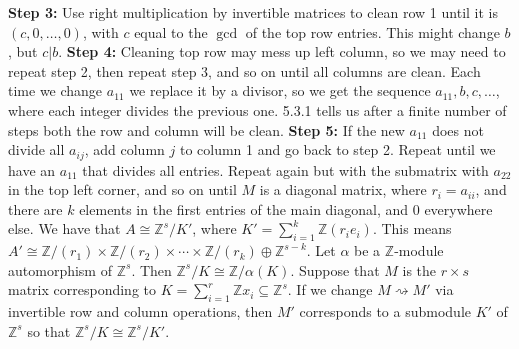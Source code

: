 \textbf{Step 3:} Use right multiplication by invertible matrices to clean row 1 until it is $(c, 0, \ldots, 0)$, with $c$ equal to the $\gcd$ of the top row entries. This might change $b$, but $c|b$.
\textbf{Step 4:} Cleaning top row may mess up left column, so we may need to repeat step 2, then repeat step 3, and so on until all columns are clean. Each time we change $a_11$ we replace it by a divisor, so we get the sequence $a_{11}, b, c, \ldots$, where each integer divides the previous one. 5.3.1 tells us after a finite number of steps both the row and column will be clean.
\textbf{Step 5:} If the new $a_{11}$ does not divide all $a_{ij}$, add column $j$ to column 1 and go back to step 2. Repeat until we have an $a_{11}$ that divides all entries. Repeat again but with the submatrix with $a_{22}$ in the top left corner, and so on until $M$ is a diagonal matrix, where $r_i = a_{ii}$, and there are $k$ elements in the first entries of the main diagonal, and 0 everywhere else. We have that $A \cong \mathbb{Z}^s/K'$, where $K' = \sum^k_{i=1} \mathbb{Z}(r_i e_i)$. This means $A' \cong \mathbb{Z}/(r_1) \times \mathbb{Z}/(r_2) \times \cdots \times \mathbb{Z}/(r_k) \oplus \mathbb{Z}^{s-k}$.
 Let $\alpha$ be a $\mathbb{Z}$-module automorphism of $\mathbb{Z}^s$. Then $\mathbb{Z}^s/K \cong \mathbb{Z}/\alpha(K)$.
 Suppose that $M$ is the $r \times s$ matrix corresponding to $K = \sum^{r}_{i=1} \mathbb{Z}x_i \subseteq \mathbb{Z}^s$. If we change $M \rightsquigarrow M'$ via invertible row and column operations, then $M'$ corresponds to a submodule $K'$ of $\mathbb{Z}^s$ so that $\mathbb{Z}^s/K \cong \mathbb{Z}^s/K'$.
